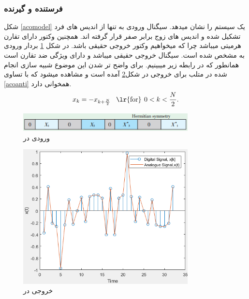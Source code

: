 \documentclass{article}
\begin{document}
\subsubsection{فرستنده و گیرنده }
 شکل \ref{acomodel} یک سیستم  را نشان میدهد. سیگنال ورودی به  تنها از اندیس های فرد تشکیل شده و اندیس های زوج برابر صفر قرار گرفته اند. ‌همچنین وکتور   دارای تقارن هرمیتی   میباشد چرا که میخواهیم وکتور خروجی    حقیقی باشد. در شکل \ref{acovec} بردار ورودی به   مشخص شده است.\cite{1} سیگنال خروجی    حقیقی میباشد و دارای ویژگی ضد تقارن  است  همانطور که در رابطه زیر میبینیم.\cite{6}
برای واضح تر شدن این موضوع شبیه سازی انجام شده در متلب برای خروجی   در شکل\ref{aco} آمده است و مشاهده میشود که با تساوی \ref{acoanti} همخوانی دارد.
\begin{equation}
x_{k} = -x_{k+\frac{N}{2}}    \hspace{8pt}\textrm{\lr{for}}  \hspace{4pt}  0 < k < \frac{N}{2} .
\label{acoanti}
\end{equation}


\begin{figure}[H]
\begin{center}
\includegraphics[width=9cm]{vec.PNG}
\end{center}
\caption{ورودی  در }
\label{acovec}
\end{figure}



\begin{figure}[H]
\begin{center}
\includegraphics[width=9cm]{xaco.PNG}
\end{center}
\caption{خروجی   در    }
\label{aco}
\end{figure}
\end{document}
